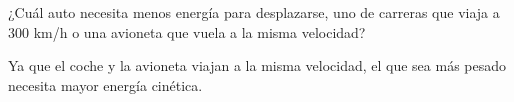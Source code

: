 ¿Cuál auto necesita menos energía para desplazarse, uno de carreras que viaja
a 300 km/h o una avioneta que vuela a la misma velocidad?

\begin{solutionbox}{2cm}
    Ya que el coche y la avioneta viajan a la misma velocidad, el que sea más
    pesado necesita mayor energía cinética.
\end{solutionbox}
